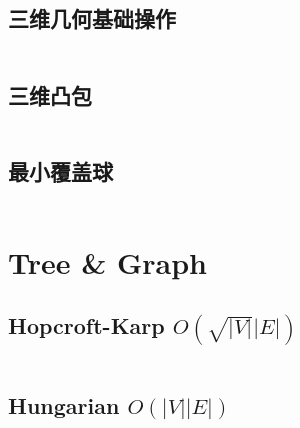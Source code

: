 \documentclass[titlepage, a4paper]{article}
\begin{document}
\begin{multicols}{2}
\begin{spacing}{0.6}
				\subsection{三维几何基础操作 \checkmark}
				\inputminted{cpp}{src/Geometry/三维几何.cpp}
				\subsection{三维凸包 \checkmark}
				\inputminted{cpp}{src/Geometry/三维凸包.cpp}
				\subsection{最小覆盖球}
				\inputminted{cpp}{src/Geometry/最小覆盖球.cpp}
				\newpage
				
			
				
			\section{Tree \& Graph}
				\subsection{Hopcroft-Karp $O(\sqrt{|V|} |E|)$ \checkmark}
				\inputminted{cpp}{src/TreeandGraph/Hopcroft.cpp}
				\subsection{Hungarian $O(|V| |E|)$ \checkmark}
				\inputminted{cpp}{src/TreeandGraph/Hungarian.cpp}

\end{spacing}
\end{multicols}
\end{document}
